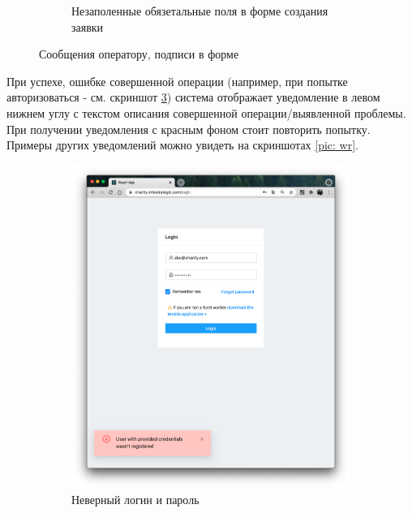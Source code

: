 \documentclass[a4paper,12pt,reqno]{article}
\begin{document}
\begin{figure}[h!]
\begin{subfigure}[b]{0.35\linewidth}
			\caption{\label{pic: success} Незаполенные обязетальные поля в форме создания заявки}
		\end{subfigure}
		\caption{\label{pic: form_obl} Сообщения оператору, подписи в форме}
	\end{figure}
	
	При успехе, ошибке совершенной операции (например, при попытке авторизоваться - см. скриншот \ref{pic: invalid}) система отображает уведомление в левом нижнем углу с текстом описания совершенной операции/выявленной проблемы. При получении уведомления с красным фоном стоит повторить попытку. Примеры других уведомлений можно увидеть на скриншотах \ref{pic: wr}.
	
	\begin{figure}[h!]
		\centering
		\begin{subfigure}[b]{0.3\linewidth}
			\includegraphics[width=\linewidth]{img/ro/login_error.png}
			\caption{\label{pic: invalid} Неверный логин и пароль}
		\end{subfigure}
		\begin{subfigure}[b]{0.3\linewidth}

\end{subfigure}
\end{figure}
\end{document}
